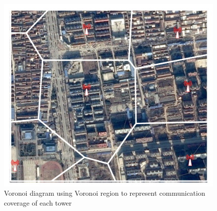
\begin{figure}[h]
    \centering
    \includegraphics[width=\linewidth]{./figures/voronoi_illustrate.pdf}
    \caption{Voronoi diagram using Voronoi region to represent communication coverage of each tower}
		\label{fig:voronoi}
\end{figure}

